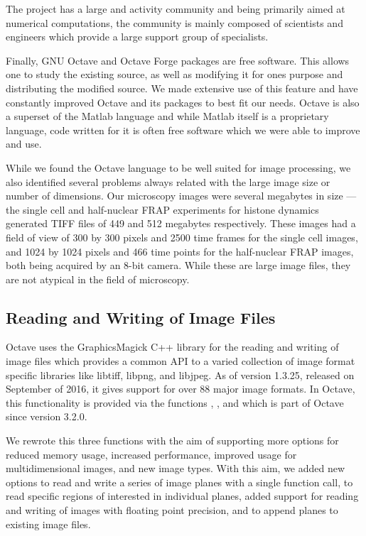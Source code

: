 The project has a large and activity community and being primarily
aimed at numerical computations, the community is mainly composed of
scientists and engineers which provide a large support group of
specialists.

Finally, GNU Octave and Octave Forge packages are free software.  This
allows one to study the existing source, as well as modifying it for
ones purpose and distributing the modified source.  We made extensive
use of this feature and have constantly improved Octave and its
packages to best fit our needs.  Octave is also a superset of the
Matlab language and while Matlab itself is a proprietary language,
code written for it is often free software which we were able to
improve and use.

While we found the Octave language to be well suited for image
processing, we also identified several problems always related with
the large image size or number of dimensions.  Our microscopy images
were several megabytes in size --- the single cell and half-nuclear
FRAP experiments for histone dynamics generated TIFF files of 449 and
512 megabytes respectively.  These images had a field of view of 300
by 300 pixels and 2500 time frames for the single cell images, and
1024 by 1024 pixels and 466 time points for the half-nuclear FRAP
images, both being acquired by an 8-bit camera.  While these are large
image files, they are not atypical in the field of microscopy.

\subsection{Reading and Writing of Image Files}

Octave uses the GraphicsMagick C++ library for the reading and writing
of image files which provides a common API to a varied collection of
image format specific libraries like libtiff, libpng, and libjpeg.  As
of version 1.3.25, released on September of 2016, it gives support for
over 88 major image formats.  In Octave, this functionality is
provided via the functions , , and
 which is part of Octave since version 3.2.0.

We rewrote this three functions with the aim of supporting more
options for reduced memory usage, increased performance, improved
usage for multidimensional images, and new image types.  With this
aim, we added new options to read and write a series of image planes
with a single function call, to read specific regions of interested in
individual planes, added support for reading and writing of images
with floating point precision, and to append planes to existing image
files.


